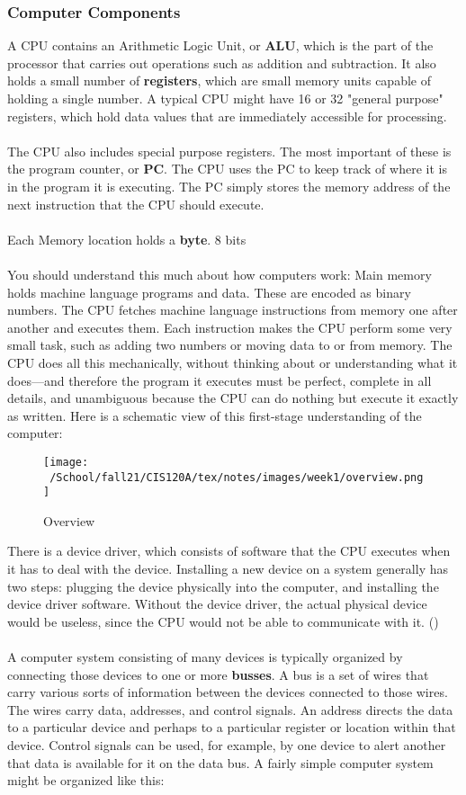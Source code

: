 \documentclass{article}
\begin{document}
\subsubsection{Computer Components}
A CPU contains an Arithmetic Logic Unit, or \textbf{ALU}, which is the part of the processor that carries out operations such as addition and subtraction. It also holds a small number of \textbf{registers}, which are small memory units capable of holding a single number. A typical CPU might have 16 or 32 "general purpose" registers, which hold data values that are immediately accessible for processing.
\\
\\
The CPU also includes special purpose registers. The most important of these is the program counter, or \textbf{PC}. The CPU uses the PC to keep track of where it is in the program it is executing. The PC simply stores the memory address of the next instruction that the CPU should execute.
\\
\\
Each Memory location holds a \textbf{byte}. 8 bits
\\
\\
You should understand this much about how computers work: Main memory holds machine language programs and data. These are encoded as binary numbers. The CPU fetches machine language instructions from memory one after another and executes them. Each instruction makes the CPU perform some very small task, such as adding two numbers or moving data to or from memory. The CPU does all this mechanically, without thinking about or understanding what it does—and therefore the program it executes must be perfect, complete in all details, and unambiguous because the CPU can do nothing but execute it exactly as written. Here is a schematic view of this first-stage understanding of the computer:

\begin{figure}[h]
\centering
\texttt{[image: ~/School/fall21/CIS120A/tex/notes/images/week1/overview.png]}
\caption{Overview\label{Overview.png}}
\end{figure}

There is a device driver, which consists of software that the CPU executes when it has to deal with the device. Installing a new device on a system generally has two steps: plugging the device physically into the computer, and installing the device driver software. Without the device driver, the actual physical device would be useless, since the CPU would not be able to communicate with it. (\cite{eck2018})
\\
\\
A computer system consisting of many devices is typically organized by connecting those devices to one or more \textbf{busses}. A bus is a set of wires that carry various sorts of information between the devices connected to those wires. The wires carry data, addresses, and control signals. An address directs the data to a particular device and perhaps to a particular register or location within that device. Control signals can be used, for example, by one device to alert another that data is available for it on the data bus. A fairly simple computer system might be organized like this:
\end{document}
